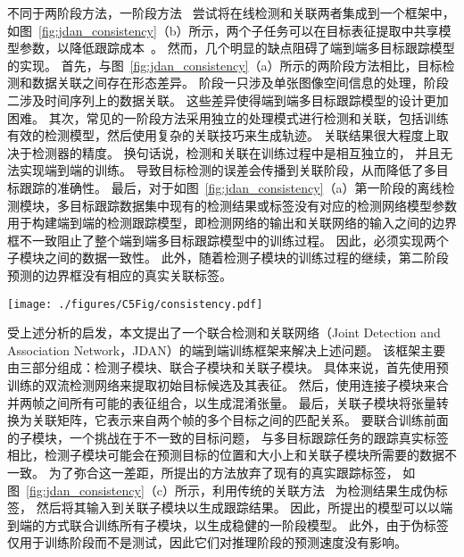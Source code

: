不同于两阶段方法，一阶段方法~\cite{jde,voigtlaender2019mots} 尝试将在线检测和关联两者集成到一个框架中，
如图~\ref{fig:jdan_consistency}（b）所示，两个子任务可以在目标表征提取中共享模型参数，以降低跟踪成本~\cite{jde,memory_improved}。
然而，几个明显的缺点阻碍了端到端多目标跟踪模型的实现。
首先，与图~\ref{fig:jdan_consistency}（a）所示的两阶段方法相比，目标检测和数据关联之间存在形态差异。
阶段一只涉及单张图像空间信息的处理，阶段二涉及时间序列上的数据关联。
这些差异使得端到端多目标跟踪模型的设计更加困难。
其次，常见的一阶段方法采用独立的处理模式进行检测和关联，包括训练有效的检测模型，然后使用复杂的关联技巧来生成轨迹。
关联结果很大程度上取决于检测器的精度。
换句话说，检测和关联在训练过程中是相互独立的，
并且无法实现端到端的训练。
导致目标检测的误差会传播到关联阶段，从而降低了多目标跟踪的准确性。
最后，对于如图~\ref{fig:jdan_consistency}（a）第一阶段的离线检测模块，多目标跟踪数据集中现有的检测结果或标签没有对应的检测网络模型参数用于构建端到端的检测跟踪模型，即检测网络的输出和关联网络的输入之间的边界框不一致阻止了整个端到端多目标跟踪模型中的训练过程。
因此，必须实现两个子模块之间的数据一致性。
此外，随着检测子模块的训练过程的继续，第二阶段预测的边界框没有相应的真实关联标签。


\begin{figure*}[ht]
	\centering
	\texttt{[image: ./figures/C5Fig/consistency.pdf]}
	\vspace{0.2em}
	\caption{两阶段、一阶段和端到端方法的对比}
	\label{fig:jdan_consistency}
\end{figure*}


受上述分析的启发，本文提出了一个联合检测和关联网络（Joint Detection and Association Network，JDAN）的端到端训练框架来解决上述问题。
该框架主要由三部分组成：检测子模块、联合子模块和关联子模块。
具体来说，首先使用预训练的双流检测网络来提取初始目标候选及其表征。
然后，使用连接子模块来合并两帧之间所有可能的表征组合，以生成混淆张量。
最后，关联子模块将张量转换为关联矩阵，它表示来自两个帧的多个目标之间的匹配关系。
要联合训练前面的子模块，一个挑战在于不一致的目标问题，
与多目标跟踪任务的跟踪真实标签相比，检测子模块可能会在预测目标的位置和大小上和关联子模块所需要的数据不一致。
为了弥合这一差距，所提出的方法放弃了现有的真实跟踪标签，
如图~\ref{fig:jdan_consistency}（c）所示，利用传统的关联方法~\cite{welch1995introduction} 为检测结果生成伪标签，
然后将其输入到关联子模块以生成跟踪结果。
因此，所提出的模型可以以端到端的方式联合训练所有子模块，以生成稳健的一阶段模型。
此外，由于伪标签仅用于训练阶段而不是测试，因此它们对推理阶段的预测速度没有影响。


